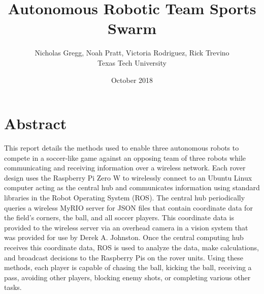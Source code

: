 \documentclass{article}
\title{
     {Autonomous Robotic Team Sports Swarm}
}
\author{Nicholas Gregg, Noah Pratt, Victoria Rodriguez, Rick Trevino \\ Texas Tech University}
\date{October 2018}
\begin{document}
     \thispagestyle{empty}
     \maketitle
     \newpage
     \section*{Abstract}
          This report details the methods used to enable three autonomous robots to compete in a soccer-like game against an opposing team of three robots while communicating and receiving information over a wireless network. Each rover design uses the Raspberry Pi Zero W to wirelessly connect to an Ubuntu Linux computer acting as the central hub and communicates information using standard libraries in the Robot Operating System (ROS). The central hub periodically queries a wireless MyRIO server for JSON files that contain coordinate data for the field’s corners, the ball, and all soccer players. This coordinate data is provided to the wireless server via an overhead camera in a vision system that was provided for use by Derek A. Johnston. Once the central computing hub receives this coordinate data, ROS is used to analyze the data, make calculations, and broadcast decisions to the Raspberry Pis on the rover units. Using these methods, each player is capable of chasing the ball,  kicking the ball, receiving a pass, avoiding other players, blocking enemy shots, or completing various other tasks.
     \newpage
     \tableofcontents
     \newpage
     \listoffigures
     \listofalgorithms
     \newpage
     \listoftables
     \newpage
\end{document}
